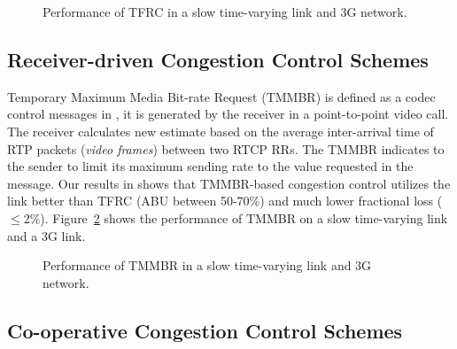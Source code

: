 \begin{figure}
  \centerline{
  }
  \caption{Performance of TFRC in a slow time-varying link and 3G network.}
  \label{fig:tfrc}
\end{figure}


\subsection{Receiver-driven Congestion Control Schemes}

Temporary Maximum Media Bit-rate Request (TMMBR) is defined as a codec control
messages in \cite{rfc5104}, it is generated by the receiver in a
point-to-point video call. The receiver calculates new estimate based on the
average inter-arrival time of RTP packets (\emph{video frames}) between two
RTCP RRs. The TMMBR indicates to the sender to limit its maximum sending rate
to the value requested in the message. Our results in  shows
that TMMBR-based congestion control utilizes the link better than TFRC (ABU
between 50-70\%) and much lower fractional loss ($\le$2\%).
Figure~\ref{fig:tmmbr} shows the performance of TMMBR on a slow time-varying
link and a 3G link.

\begin{figure}
  \centerline{
  }
  \caption{Performance of TMMBR in a slow time-varying link and 3G network.}
  \label{fig:tmmbr}
\end{figure}

\subsection{Co-operative Congestion Control Schemes}


